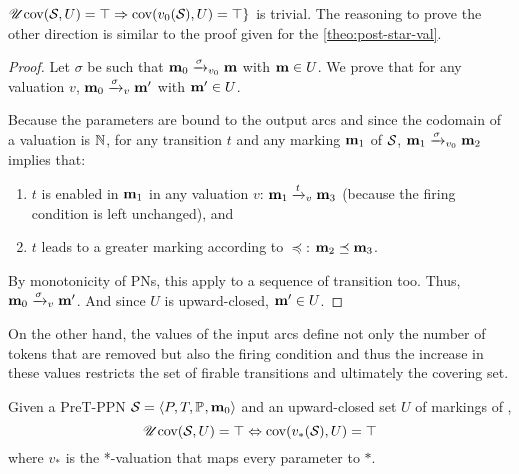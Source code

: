 \(\UcovOp(\namePPN, U) = \top \Rightarrow \cov{v_0(\namePPN)}{U} = \top\}\) is trivial.
The reasoning to prove the other direction is similar to the proof given for the \autoref{theo:post-star-val}.

\begin{proof}
  Let $\sigma$ be such that $\mari \fire[\val_0]{\sigma} \mar$ with $\mar \in U$.
  We prove that for any valuation $v$, $\mari \fire[v]{\sigma} \marp$ with $\marp \in U$.

  Because the parameters are bound to the output arcs and since the codomain of a valuation is $\naturals$, for any transition $t$ and any marking $\mar_1$ of $\namePPN$, $\mar_1 \fire[v_0]{\sigma} \mar_2$ implies that:
  \begin{enumerate}
    \item $t$ is enabled in $\mar_1$ in any valuation $v$: $\mar_1 \fire[v]{t} \mar_3$ (because the firing condition is left unchanged), and
    \item $t$ leads to a greater marking according to $\preceq$: $\mar_2 \preceq \mar_3$.
  \end{enumerate}

  By monotonicity of \acp{PN}, this apply to a sequence of transition too.
  Thus, $\mari \fire[v]{\sigma} \marp$.
  And since $U$ is upward-closed, $\marp \in U$.
\end{proof}

On the other hand, the values of the input arcs define not only the number of tokens that are removed but also the firing condition and thus the increase in these values restricts the set of firable transitions and ultimately the covering set.

\begin{theo}
  \label{theo:pre-u-star-val}
  Given a PreT-\ac{PPN} $\defPPN$ and an upward-closed set $U$ of markings of \namePPN, \[\UcovOp(\namePPN, U) = \top \Leftrightarrow \cov{v_*(\namePPN)}{U} = \top\] where $v_*$ is the *-valuation that maps every parameter to $*$.
\end{theo}

